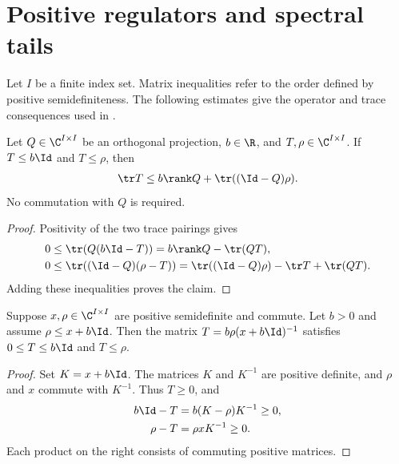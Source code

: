 \section{Positive regulators and spectral tails}
\label{sec:patch_regulator}

Let $I$ be a finite index set. Matrix inequalities refer to the order defined
by positive semidefiniteness. The following estimates give the operator and
trace consequences used in \cite[Section~4, regulator estimate]{OpenAI2026PolynomialPEPS}.


\begin{theorem}
\label{thm:patch_projection_trace}
\leanok
Let $Q\in\C^{I\times I}$ be an orthogonal projection, $b\in\R$, and
$T,\rho\in\C^{I\times I}$. If $T\le b\Id$ and $T\le\rho$, then
\begin{align}
 \tr T\le b\rank Q+\tr((\Id-Q)\rho).
\end{align}
No commutation with $Q$ is required.
\end{theorem}
\begin{proof}
\leanok
Positivity of the two trace pairings gives
\begin{align}
 0&\le\tr(Q(b\Id-T))=b\rank Q-\tr(QT),\notag\\
 0&\le\tr((\Id-Q)(\rho-T))
   =\tr((\Id-Q)\rho)-\tr T+\tr(QT).
\end{align}
Adding these inequalities proves the claim.
\end{proof}

\begin{theorem}
\label{thm:patch_regulator_order}
\leanok
Suppose $x,\rho\in\C^{I\times I}$ are positive semidefinite and commute.
Let $b>0$ and assume $\rho\le x+b\Id$. Then the matrix
$T=b\rho(x+b\Id)^{-1}$ satisfies $0\le T\le b\Id$ and $T\le\rho$.
\end{theorem}
\begin{proof}
\leanok
{}
Set $K=x+b\Id$. The matrices $K$ and $K^{-1}$ are positive definite,
and $\rho$ and $x$ commute with $K^{-1}$. Thus $T\ge0$, and
\begin{align}
 b\Id-T&=b(K-\rho)K^{-1}\ge0,\notag\\
 \rho-T&=\rho xK^{-1}\ge0.
\end{align}
Each product on the right consists of commuting positive matrices.
\end{proof}

